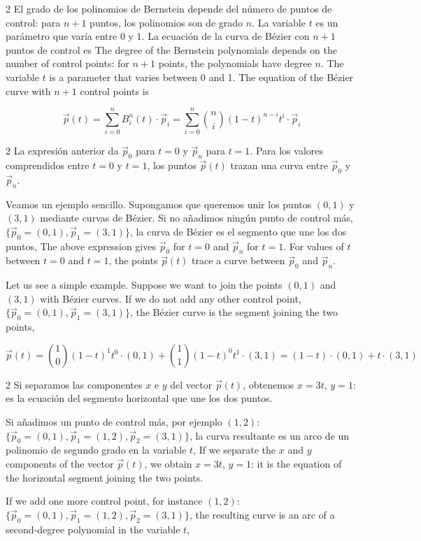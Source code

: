 \begin{paracol}{2}
El grado de los polinomios de Bernstein depende del número de puntos de control: para $n+1$ puntos, los polinomios son de grado $n$. La variable $t$ es un parámetro que varía entre $0$ y $1$. La ecuación de la curva de Bézier con $n+1$ puntos de control es
\switchcolumn
The degree of the Bernstein polynomials depends on the number of control points: for $n+1$ points, the polynomials have degree $n$. The variable $t$ is a parameter that varies between 0 and 1. The equation of the Bézier curve with $n+1$ control points is
\end{paracol}
\begin{equation*}
\vec{p}(t) = \sum_{i = 0}^n B_i^n(t) \cdot \vec{p}_i = \sum_{i = 0}^n \binom{n}{i}\left(1-t\right)^{n-i}t^i  \cdot \vec{p}_i
\end{equation*}
\begin{paracol}{2}
La expresión anterior da $\vec{p}_0$ para $t = 0$ y $\vec{p}_n$ para $t = 1$. Para los valores comprendidos entre $t=0$ y $t=1$, los puntos $\vec{p}(t)$ trazan una curva entre $\vec{p}_0$ y $\vec{p}_n$.

Veamos un ejemplo sencillo. Supongamos que queremos unir los puntos $(0,1)$ y $(3,1)$ mediante curvas de Bézier. Si no añadimos ningún punto de control más, $\lbrace\vec{p}_0 = (0,1), \vec{p}_1 = (3,1)\rbrace$, la curva de Bézier es el segmento que une los dos puntos,
\switchcolumn
The above expression gives $\vec{p}_0$ for $t=0$ and $\vec{p}_n$ for $t=1$. For values of $t$ between $t=0$ and $t=1$, the points $\vec{p}(t)$ trace a curve between $\vec{p}_0$ and $\vec{p}_n$.

Let us see a simple example. Suppose we want to join the points $(0,1)$ and $(3,1)$ with Bézier curves. If we do not add any other control point, $\lbrace\vec{p}_0 = (0,1), \vec{p}_1 = (3,1)\rbrace$, the Bézier curve is the segment joining the two points,
\end{paracol}
\begin{equation*}
\vec{p}(t) = \binom{1}{0}\left(1-t\right)^{1}t^0  \cdot (0,1) +  \binom{1}{1}\left(1-t\right)^{0}t^1  \cdot (3,1) = \left(1-t\right)  \cdot (0,1) + t\cdot (3,1)
\end{equation*}
\begin{paracol}{2}
Si separamos las componentes $x$ e $y$ del vector $\vec{p}(t)$, obtenemos $x = 3t$, $y = 1$: es la ecuación del segmento horizontal que une los dos puntos.

Si añadimos un punto de control más, por ejemplo $(1,2)$: $\lbrace\vec{p}_0 = (0,1), \vec{p}_1 = (1,2), \vec{p}_2 = (3,1)\rbrace$, la curva resultante es un arco de un polinomio de segundo grado en la variable $t$,
\switchcolumn
If we separate the $x$ and $y$ components of the vector $\vec{p}(t)$, we obtain $x = 3t$, $y = 1$: it is the equation of the horizontal segment joining the two points.

If we add one more control point, for instance $(1,2)$: $\lbrace\vec{p}_0 = (0,1), \vec{p}_1 = (1,2), \vec{p}_2 = (3,1)\rbrace$, the resulting curve is an arc of a second-degree polynomial in the variable $t$,
\end{paracol}
